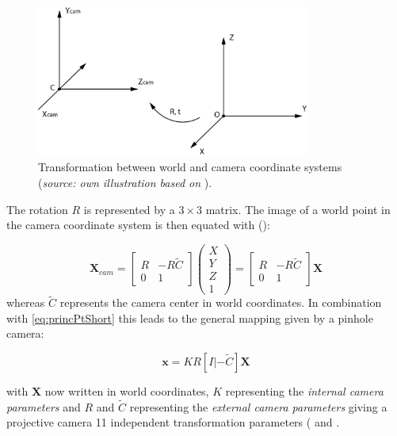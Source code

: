 \begin{figure}[htbp]
		\centering
		\includegraphics[width=0.8\textwidth]{figures/CoordinateSystemRT}
		\caption[Transformation between world and camera coordinate systems]{Transformation between world and camera coordinate systems (\textit{source: own illustration based on} \cite[p.156]{Hartley.2011}).}
		\label{fig:CoordinateSystemRT}
\end{figure}

The rotation $R$ is represented by a $3\times 3$ matrix. The image of a world point in the camera coordinate system is then equated with (\cite[p.155 et seq.]{Hartley.2011}):

\begin{equation}
 \mathbf{X}_{cam}=
 \begin{bmatrix}
  R & -R\tilde{C} \\
  0 & 1
 \end{bmatrix}
 \begin{pmatrix}
  X \\
  Y \\
  Z \\
  1
 \end{pmatrix}=
 \begin{bmatrix}
  R & -R\tilde{C} \\
  0 & 1
 \end{bmatrix}\mathbf{X}
\end{equation}
whereas $\tilde{C}$ represents the camera center in world coordinates.
In combination with \autoref{eq:princPtShort} this leads to the general mapping given by a pinhole camera:

\begin{equation}
 \mathbf{x}=KR[I|-\tilde{C}]\mathbf{X}\label{eq:pinholeMapping}
\end{equation}

with $\mathbf{X}$ now written in world coordinates, $K$ representing the \textit{internal camera parameters} and $R$ and $\tilde{C}$ representing the \textit{external camera parameters} giving a projective camera 11 independent transformation parameters (\cite[p.156 et seq.]{Hartley.2011} and \cite[p.274]{Luhmann.2014}. 

